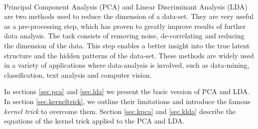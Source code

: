 \paragraph{}
Principal Component Analysis (PCA) and Linear Discriminant Analysis (LDA) are two methods used to
reduce the dimension of a data-set. They are very useful as a pre-processing step, which has proven
to greatly improve results of further data analysis. The task consists of removing noise,
de-correlating and reducing the dimension of the data. This step enables a better insight into
the true latent structure and the hidden patterns of the data-set. These methods are widely used in a
variety of applications where data-analysis is involved, such as data-mining, classification, text
analysis and computer vision.

In sections \ref{sec.pca} and \ref{sec.lda} we present the basic version of PCA and LDA. In section
\ref{sec.kerneltrick}, we outline their limitations and introduce the famous \emph{kernel trick} to
overcome them. Section \ref{sec.kpca} and \ref{sec.klda} describe the equations of the kernel trick
applied to the PCA and LDA.
